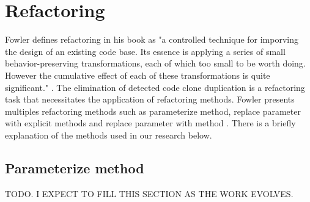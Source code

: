 \en

\section{Refactoring}

Fowler defines refactoring in his book as "a controlled technique for imporving the design of an existing code base. Its
essence is applying a series of small behavior-preserving transformations, each of which too small to be worth doing. However
the cumulative effect of each of these transformations is quite significant." \citep{refactorbook}. The elimination of detected 
code clone duplication is a refactoring task that necessitates the application of refactoring methods. 
Fowler presents multiples refactoring methods such as parameterize method, replace parameter with explicit methods and 
replace parameter with method \citep{refactorbook}. There is a briefly explanation of the methods used in our research below.

\subsection{Parameterize method}

TODO. I EXPECT TO FILL THIS SECTION AS THE WORK EVOLVES.
